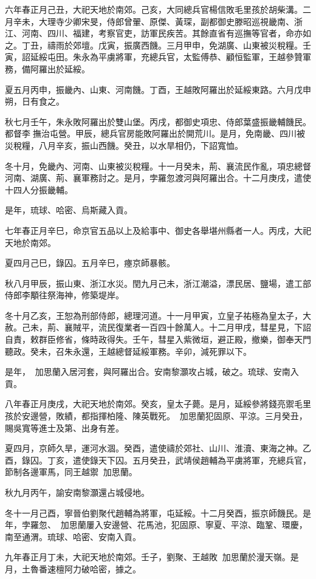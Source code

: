 \begin{pinyinscope}
六年春正月己丑，大祀天地於南郊。己亥，大同總兵官楊信敗毛里孩於胡柴溝。二月辛未，大理寺少卿宋旻，侍郎曾翬、原傑、黃琛，副都御史滕昭巡視畿南、浙江、河南、四川、福建，考察官吏，訪軍民疾苦。其餘直省有巡撫等官者，命亦如之。丁丑，禱雨於郊壇。戊寅，振廣西饑。三月甲申，免湖廣、山東被災稅糧。壬寅，詔延綏屯田。朱永為平虜將軍，充總兵官，太監傅恭、顧恒監軍，王越參贊軍務，備阿羅出於延綏。

夏五月丙申，振畿內、山東、河南饑。丁酉，王越敗阿羅出於延綏東路。六月戊申朔，日有食之。

秋七月壬午，朱永敗阿羅出於雙山堡。丙戌，都御史項忠、侍郎葉盛振畿輔饑民。都督李撫治屯營。甲辰，總兵官房能敗阿羅出於開荒川。是月，免南畿、四川被災稅糧，八月辛亥，振山西饑。癸丑，以水旱相仍，下詔寬恤。

冬十月，免畿內、河南、山東被災稅糧。十一月癸未，荊、襄流民作亂，項忠總督河南、湖廣、荊、襄軍務討之。是月，孛羅忽渡河與阿羅出合。十二月庚戌，遣使十四人分振畿輔。

是年，琉球、哈密、烏斯藏入貢。

七年春正月辛巳，命京官五品以上及給事中、御史各舉堪州縣者一人。丙戌，大祀天地於南郊。

夏四月己巳，錄囚。五月辛巳，瘞京師暴骸。

秋八月甲辰，振山東、浙江水災。閏九月己未，浙江潮溢，漂民居、鹽場，遣工部侍郎李顒往祭海神，修築堤岸。

冬十月乙亥，王恕為刑部侍郎，總理河道。十一月甲寅，立皇子祐極為皇太子，大赦。己未，荊、襄賊平，流民復業者一百四十餘萬人。十二月甲戌，彗星見，下詔自責，敕群臣修省，條時政得失。壬午，彗星入紫微垣，避正殿，撤樂，御奉天門聽政。癸未，召朱永還，王越總督延綏軍務。辛卯，減死罪以下。

是年，加思蘭入居河套，與阿羅出合。安南黎灝攻占城，破之。琉球、安南入貢。

八年春正月庚戌，大祀天地於南郊。癸亥，皇太子薨。是月，延綏參將錢亮禦毛里孩於安邊營，敗績，都指揮柏隆、陳英戰死。加思蘭犯固原、平涼。三月癸丑，賜吳寬等進士及第、出身有差。

夏四月，京師久旱，運河水涸。癸酉，遣使禱於郊社、山川、淮瀆、東海之神。乙酉，錄囚。丁亥，遣使錄天下囚。五月癸丑，武靖侯趙輔為平虜將軍，充總兵官，節制各邊軍馬，同王越禦加思蘭。

秋九月丙午，諭安南黎灝還占城侵地。

冬十一月己酉，寧晉伯劉聚代趙輔為將軍，屯延綏。十二月癸酉，振京師饑民。是年，孛羅忽、加思蘭屢入安邊營、花馬池，犯固原、寧夏、平涼、臨鞏、環慶，南至通渭。琉球、哈密、安南入貢。

九年春正月丁未，大祀天地於南郊。壬子，劉聚、王越敗加思蘭於漫天嶺。是月，土魯番速檀阿力破哈密，據之。


\end{pinyinscope}
